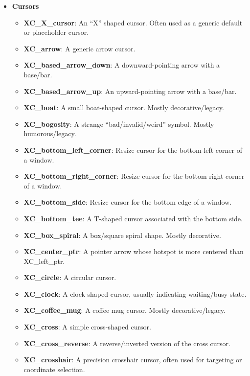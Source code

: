 \documentclass{report}
\begin{document}
    \pagebreak 
    \begin{itemize}
        \item \textbf{Cursors}
            \begin{itemize}
                \item \textbf{XC\_X\_cursor}:	An “X” shaped cursor. Often used as a generic default or placeholder cursor.
                \item \textbf{XC\_arrow}:	A generic arrow cursor.
                \item \textbf{XC\_based\_arrow\_down}:	A downward-pointing arrow with a base/bar.
                \item \textbf{XC\_based\_arrow\_up}:	An upward-pointing arrow with a base/bar.
                \item \textbf{XC\_boat}:	A small boat-shaped cursor. Mostly decorative/legacy.
                \item \textbf{XC\_bogosity}:	A strange “bad/invalid/weird” symbol. Mostly humorous/legacy.
                \item \textbf{XC\_bottom\_left\_corner}:	Resize cursor for the bottom-left corner of a window.
                \item \textbf{XC\_bottom\_right\_corner}:	Resize cursor for the bottom-right corner of a window.
                \item \textbf{XC\_bottom\_side}:	Resize cursor for the bottom edge of a window.
                \item \textbf{XC\_bottom\_tee}:	A T-shaped cursor associated with the bottom side.
                \item \textbf{XC\_box\_spiral}:	A box/square spiral shape. Mostly decorative.
                \item \textbf{XC\_center\_ptr}:	A pointer arrow whose hotspot is more centered than XC\_left\_ptr.
                \item \textbf{XC\_circle}:	A circular cursor.
                \item \textbf{XC\_clock}:	A clock-shaped cursor, usually indicating waiting/busy state.
                \item \textbf{XC\_coffee\_mug}:	A coffee mug cursor. Mostly decorative/legacy.
                \item \textbf{XC\_cross}:	A simple cross-shaped cursor.
                \item \textbf{XC\_cross\_reverse}:	A reverse/inverted version of the cross cursor.
                \item \textbf{XC\_crosshair}:	A precision crosshair cursor, often used for targeting or coordinate selection.

\end{itemize}
\end{itemize}
\end{document}
